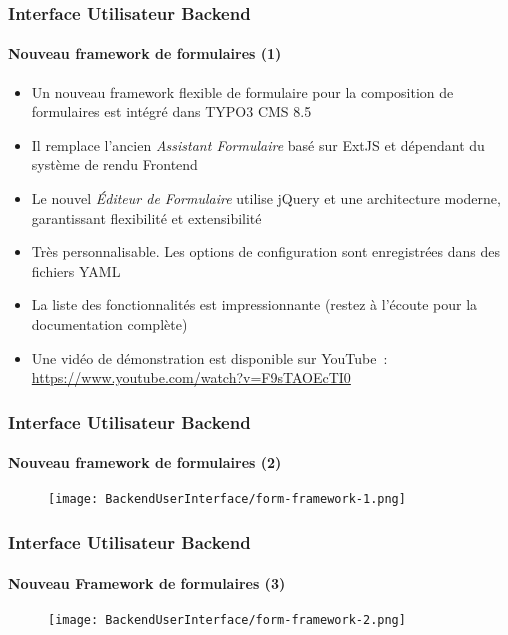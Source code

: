 \begin{frame}[fragile]
	\frametitle{Interface Utilisateur Backend}
	\framesubtitle{Nouveau framework de formulaires (1)}

	\begin{itemize}
		\item Un nouveau framework flexible de formulaire pour la composition de
			formulaires est intégré dans TYPO3 CMS 8.5
		\item Il remplace l'ancien \textit{Assistant Formulaire} basé sur ExtJS et
			dépendant du système de rendu Frontend
		\item Le nouvel \textit{Éditeur de Formulaire} utilise jQuery et une architecture
			moderne, garantissant flexibilité et extensibilité
		\item Très personnalisable. Les options de configuration sont enregistrées dans des fichiers YAML
		\item La liste des fonctionnalités est impressionnante\newline
			\small(restez à l'écoute pour la documentation complète)\normalsize
		\item Une vidéo de démonstration est disponible sur YouTube~:\newline
			\url{https://www.youtube.com/watch?v=F9sTAOEcTI0}
	\end{itemize}

\end{frame}
\begin{frame}[fragile]
	\frametitle{Interface Utilisateur Backend}
	\framesubtitle{Nouveau framework de formulaires (2)}

	\begin{figure}
		\texttt{[image: BackendUserInterface/form-framework-1.png]}
	\end{figure}

\end{frame}

\begin{frame}[fragile]
	\frametitle{Interface Utilisateur Backend}
	\framesubtitle{Nouveau Framework de formulaires (3)}

	\begin{figure}
		\texttt{[image: BackendUserInterface/form-framework-2.png]}
	\end{figure}

\end{frame}


